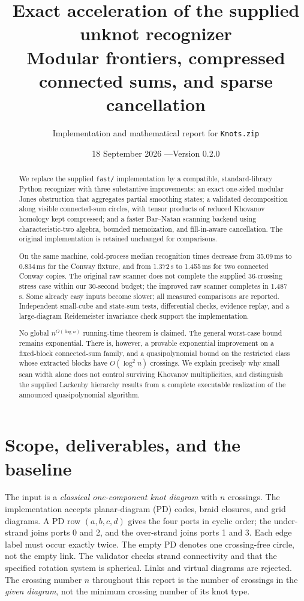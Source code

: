 \documentclass[11pt,a4paper]{article}
\title{Exact acceleration of the supplied unknot recognizer\\[4pt]
\large Modular frontiers, compressed connected sums, and sparse cancellation}
\author{Implementation and mathematical report for \texttt{Knots.zip}}
\date{18 September 2026 \quad---\quad Version 0.2.0}
\theoremstyle{definition}\newtheorem{remark}[theorem]{Remark}
\begin{document}
\maketitle
\begin{abstract}
We replace the supplied \texttt{fast/} implementation by a compatible,
standard-library Python recognizer with three substantive improvements: an exact
one-sided modular Jones obstruction that aggregates partial smoothing states;
a validated decomposition along visible connected-sum circles, with tensor products
of reduced Khovanov homology kept compressed; and a faster Bar--Natan scanning
backend using characteristic-two algebra, bounded memoization, and fill-in-aware
cancellation. The original implementation is retained unchanged for comparisons.

On the same machine, cold-process median recognition times decrease from
35.09\,ms to 0.834\,ms for the Conway fixture, and from 1.372\,s to
1.455\,ms for two connected Conway copies. The original raw scanner does not
complete the supplied 36-crossing stress case within our 30-second budget;
the improved raw scanner completes in 1.487\,s. Some already easy inputs become
slower; all measured comparisons are reported. Independent small-cube and
state-sum tests, differential checks, evidence replay, and a large-diagram
Reidemeister invariance check support the implementation.

No global $n^{O(\log n)}$ running-time theorem is claimed. The general worst-case
bound remains exponential. There is, however, a provable exponential improvement
on a fixed-block connected-sum family, and a quasipolynomial bound on the restricted
class whose extracted blocks have $O(\log^2 n)$ crossings. We explain precisely
why small scan width alone does not control surviving Khovanov multiplicities,
and distinguish the supplied Lackenby hierarchy results from a complete executable
realization of the announced quasipolynomial algorithm.
\end{abstract}

\clearpage
\begingroup\small\setlength{\parskip}{0pt}
\tableofcontents
\endgroup
\clearpage

\section{Scope, deliverables, and the baseline}
\label{sec:scope}
The input is a \emph{classical one-component knot diagram} with $n$ crossings.
The implementation accepts planar-diagram (PD) codes, braid closures, and grid
diagrams. A PD row $(a,b,c,d)$ gives the four ports in cyclic order; the
under-strand joins ports 0 and 2, and the over-strand joins ports 1 and 3.
Each edge label must occur exactly twice. The empty PD denotes one crossing-free
circle, not the empty link. The validator checks strand connectivity and that the
specified rotation system is spherical. Links and virtual diagrams are rejected.
The crossing number $n$ throughout this report is the number of crossings in the
\emph{given diagram}, not the minimum crossing number of its knot type.
\end{document}
